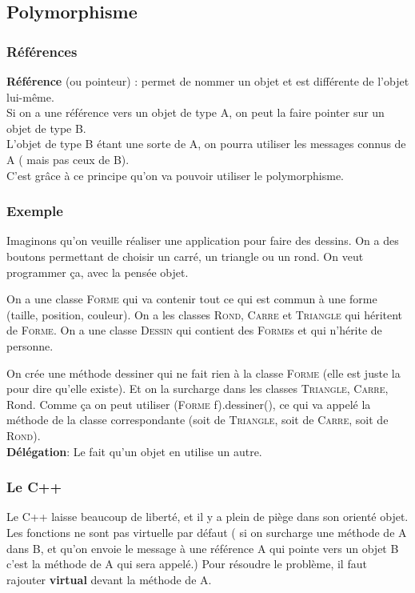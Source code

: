 \subsection{Polymorphisme}



\subsubsection{Références}
\textbf{Référence} (ou pointeur) : permet de nommer un objet et est différente de l’objet lui-même.
\\Si on a une référence vers un objet de type A, on peut la faire pointer sur un objet de type B.
\\L’objet de type B étant une sorte de A, on pourra utiliser les messages connus de A ( mais pas ceux de B).
\\C’est grâce à ce principe qu’on va pouvoir utiliser le polymorphisme.



\subsubsection{Exemple}
Imaginons qu'on veuille réaliser une application pour faire des dessins. On a des boutons permettant de choisir un carré, un triangle ou un rond. On veut programmer ça, avec la pensée objet.

On a une classe \textsc{Forme} qui va contenir tout ce qui est commun à une forme (taille, position, couleur). On a les classes \textsc{Rond}, \textsc{Carre} et \textsc{Triangle} qui héritent de \textsc{Forme}. On a une classe \textsc{Dessin} qui contient des \textsc{Forme}s et qui n’hérite de personne.

On crée une méthode dessiner qui ne fait rien à la classe \textsc{Forme} (elle est juste la pour dire qu’elle existe). Et on la surcharge dans les classes \textsc{Triangle}, \textsc{Carre}, Rond. Comme ça on peut utiliser (\textsc{Forme} f).dessiner(), ce qui va appelé la méthode de la classe correspondante (soit de \textsc{Triangle}, soit de \textsc{Carre}, soit de \textsc{Rond}).
\\\textbf{Délégation}: Le fait qu’un objet en utilise un autre.



\subsubsection{Le C++}
Le C++ laisse beaucoup de liberté, et il y a plein de piège dans son orienté objet.
Les fonctions ne sont pas virtuelle par défaut ( si on surcharge une méthode de A dans B, et qu’on envoie le message à une référence A qui pointe vers un objet B c’est la méthode de A qui sera appelé.) Pour résoudre le problème, il faut rajouter \textbf{virtual} devant la méthode de A.


